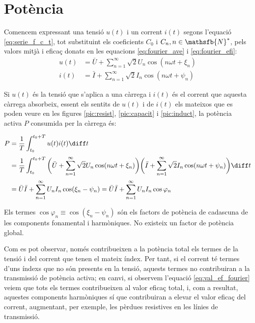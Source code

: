 \section{Potència}

Comencem expressant una tensió $u(t)$ i un corrent $i(t)$
 segons l'equació \eqref{eq:serie_f_c_t}, tot substituint els
 coeficients $C_0$ i $C_n, n \in \mathsfb{N}^*$, pels valors mitjà i eficaç
 donats en les equacions \eqref{eq:fourier_ave} i \eqref{eq:fourier_efi}:
 \begin{align}
    u(t)  &= \bar{U} + \sum_{n=1}^\infty \sqrt{2} U_n \cos (n \omega t +
    \xi_n)\\[0.5ex]
    i(t)  &= \bar{I} + \sum_{n=1}^\infty \sqrt{2} I_n \cos (n \omega t + \psi_n)
 \end{align}

Si  $u(t)$ és la tensió que s'aplica a una càrrega i $i(t)$ és el
corrent que aquesta càrrega absorbeix, essent els sentits de $u(t)$
i de $i(t)$ els mateixos que es poden veure en les figures
\ref{pic:resist}, \ref{pic:capacit} i \ref{pic:induct}, la potència
activa $P$ consumida per la càrrega és:

\begin{equation}\begin{split}
    P &= \frac{1}{T} \int_{t_0}^{t_0+T} u(t) i(t) \diff t 
    \\[0.5ex]
     &= \frac{1}{T} \int_{t_0}^{t_0+T} \bigg(\bar{U} + \sum_{n=1}^\infty
    \sqrt{2} U_n \cos (n \omega t + \xi_n) \bigg)
    \bigg(\bar{I} + \sum_{n=1}^\infty \sqrt{2} I_n
    \cos (n \omega t + \psi_n)\bigg) \diff t\\[0.5ex]
    &=\bar{U} \bar{I} + \sum_{n=1}^\infty U_n I_n
    \cos(\xi_n-\psi_n) = \bar{U} \bar{I} + \sum_{n=1}^\infty U_n I_n
    \cos \varphi_n \label{eq:pot_fu}
\end{split}\end{equation}

Els termes $\cos \varphi_n \equiv \cos (\xi_n-\psi_n)$ són els factors de
potència de cadascuna de les components fonamental i harmòniques. No
existeix un factor de potència global.

 Com es pot observar, només contribueixen a la potència
total els termes de la tensió i del corrent que tenen el mateix
índex. Per tant, si el corrent té termes d'uns índexs que no són
presents en la tensió, aquests termes no contribuiran a la
transmissió de  potència activa; en canvi, si observem l'equació
\eqref{eq:val_ef_fourier} veiem que tots els termes contribueixen al
valor eficaç total, i, com a resultat, aquestes components harmòniques sí que
contribuiran a elevar el valor eficaç del corrent, augmentant, per exemple, 
 les pèrdues resistives en les línies de transmissió.


